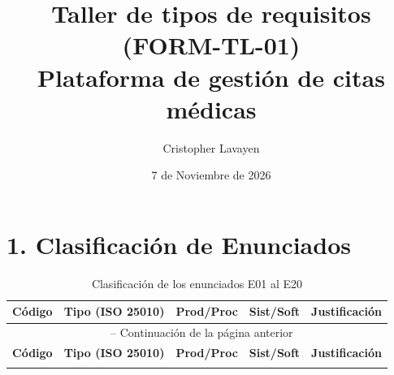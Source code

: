 \documentclass[12pt,a4paper]{article}
\title{Taller de tipos de requisitos (FORM-TL-01) \\ 
\vspace{0.3cm} 
\large {Plataforma de gestión de citas médicas}}
\author{Cristopher Lavayen}
\date{7 de Noviembre de 2026}
\begin{document}
\maketitle

\section*{1. Clasificación de Enunciados}

\renewcommand{\arraystretch}{1.5}
\begin{longtable}{|c|p{3.5cm}|c|c|p{5cm}|}
\caption{Clasificación de los enunciados E01 al E20}
\label{tab:clasificacion} \\
\hline
\textbf{Código} & \textbf{Tipo (ISO 25010)} & \textbf{Prod/Proc} & \textbf{Sist/Soft} & \textbf{Justificación} \\
\hline
\endfirsthead

\multicolumn{5}{c}{{\tablename\ \thetable{} -- Continuación de la página anterior}} \\
\hline
\textbf{Código} & \textbf{Tipo (ISO 25010)} & \textbf{Prod/Proc} & \textbf{Sist/Soft} & \textbf{Justificación} \\
\hline
\endhead

\hline
\endfoot

\hline
\endlastfoot


\end{longtable}
\end{document}
